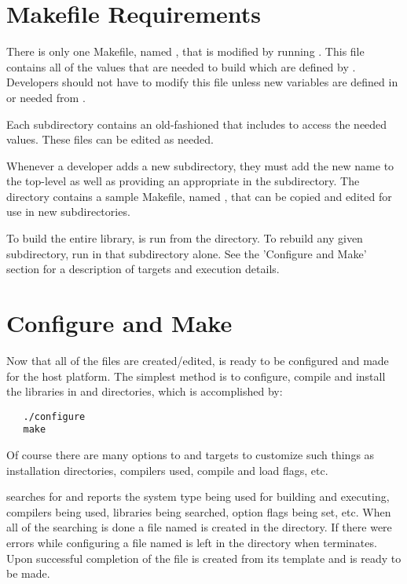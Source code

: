 \section{Makefile Requirements}
\label{Makefile Requirements}

There is only one Makefile, named , that is modified by running 
.  This file contains all of the values that are needed to build \hypre{} 
which are defined by . Developers should not have to modify this file unless
new variables are defined in or needed from .

Each \hypre{} subdirectory contains an old-fashioned  that includes 
 to access the needed values. These files can be edited as needed.

Whenever a developer adds a new subdirectory, they must add the new name to the top-level 
 as well as providing an appropriate  in the subdirectory.
The  directory contains a sample Makefile, named ,
that can be copied and edited for use in new subdirectories. 

To build the entire \hypre{} library,  is run from the  
directory. To rebuild any given subdirectory, run  in that subdirectory alone.
See the 'Configure and Make' section for a description of  targets and execution details.

\section{Configure and Make}
\label{Configure and Make}

Now that all of the files are created/edited, \hypre{} is ready to be configured
and made for the host platform.  The simplest method is to configure, compile and
install the libraries in  and  directories, which is
accomplished by:
\begin{verbatim}
   ./configure
   make
\end{verbatim}

Of course there are many options to  and  targets to 
customize such things as installation directories, compilers used, compile and
load flags, etc.  

 searches for and reports the system type being used for building 
and executing, compilers being used, libraries being searched, option flags being set,
 etc.  When all of the searching is done a file named  is created 
in the  directory.  If there were errors while configuring a file 
named  is left in the  directory when 
terminates. Upon successful completion of  the file  
is created from its template  and \hypre{} is ready to be made.

